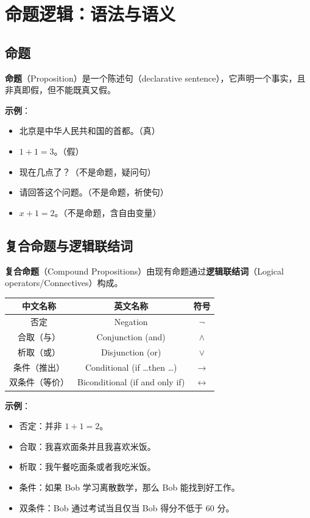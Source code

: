 \documentclass[UTF8,11pt,a4paper]{ctexbook}   %
\theoremstyle{definition}
\begin{document}
\section{命题逻辑：语法与语义}

\subsection{命题}

\textbf{命题}（Proposition）是一个陈述句（declarative sentence），它声明一个事实，且非真即假，但不能既真又假。

\textbf{示例}：
\begin{itemize}
    \item 北京是中华人民共和国的首都。（真）
    \item $1+1=3$。（假）
    \item 现在几点了？（不是命题，疑问句）
    \item 请回答这个问题。（不是命题，祈使句）
    \item $x+1=2$。（不是命题，含自由变量）
\end{itemize}

\subsection{复合命题与逻辑联结词}

\textbf{复合命题}（Compound Propositions）由现有命题通过\textbf{逻辑联结词}（Logical operators/Connectives）构成。

\begin{table}[htbp]
\centering
\begin{tabular}{|c|c|c|}
\hline
\textbf{中文名称} & \textbf{英文名称} & \textbf{符号} \\
\hline
否定 & Negation & $\neg$ \\
合取（与） & Conjunction (and) & $\land$ \\
析取（或） & Disjunction (or) & $\lor$ \\
条件（推出） & Conditional (if \ldots then \ldots) & $\rightarrow$ \\
双条件（等价） & Biconditional (if and only if) & $\leftrightarrow$ \\
\hline
\end{tabular}
\end{table}

\textbf{示例}：
\begin{itemize}
    \item 否定：并非 $1+1=2$。
    \item 合取：我喜欢面条并且我喜欢米饭。
    \item 析取：我午餐吃面条或者我吃米饭。
    \item 条件：如果 Bob 学习离散数学，那么 Bob 能找到好工作。
    \item 双条件：Bob 通过考试当且仅当 Bob 得分不低于 60 分。
\end{itemize}
\end{document}
